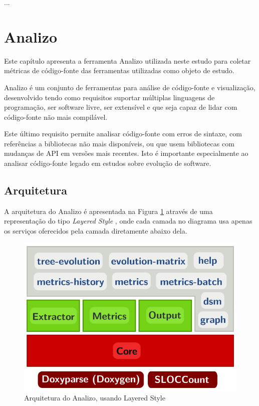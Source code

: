 
...

\section{Analizo}

Este capítulo apresenta a ferramenta Analizo utilizada neste estudo para
coletar métricas de código-fonte das ferramentas utilizadas como objeto de
estudo.

\label{analizo}

Analizo é um conjunto de ferramentas para análise de código-fonte e
visualização, desenvolvido tendo como requisitos suportar múltiplas linguagens
de programação, ser software livre, ser extensível e que seja capaz de lidar
com código-fonte não mais compilável.

Este último requisito permite analisar código-fonte com erros de sintaxe, com
referências a bibliotecas não mais disponíveis, ou que usem bibliotecas com
mudanças de API em versões mais recentes. Isto é importante especialmente ao
analisar código-fonte legado em estudos sobre evolução de software.

\subsection{Arquitetura}

A arquitetura do Analizo é apresentada na Figura \ref{arquitetura-analizo}
através de uma representação do tipo {\it Layered Style} \cite{Clements2002},
onde cada camada no diagrama usa apenas os serviços oferecidos pela camada
diretamente abaixo dela.

\begin{figure}[h]
\center
\includegraphics[scale=0.3]{imagens/analizo-architecture.png}
\caption{Arquitetura do Analizo, usando Layered Style \cite{Clements2002}}
\label{arquitetura-analizo}
\end{figure}

